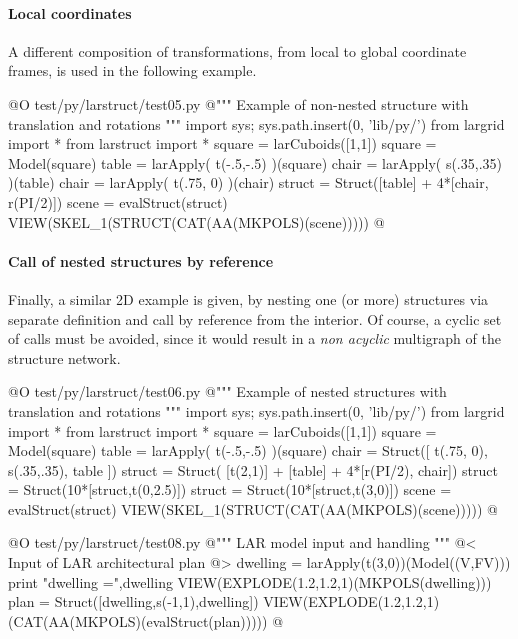 \documentclass[11pt,oneside]{article}    %
\begin{document}
\paragraph{Local coordinates}
A different composition of transformations, from local to global coordinate frames, is used in the following example.

@O test/py/larstruct/test05.py
@{""" Example of non-nested structure with translation and rotations """
import sys; sys.path.insert(0, 'lib/py/')
from largrid import *
from larstruct import *
square = larCuboids([1,1])
square = Model(square)
table = larApply( t(-.5,-.5) )(square)
chair = larApply( s(.35,.35) )(table)
chair = larApply( t(.75, 0) )(chair)
struct = Struct([table] + 4*[chair, r(PI/2)])
scene = evalStruct(struct)
VIEW(SKEL_1(STRUCT(CAT(AA(MKPOLS)(scene)))))
@}

\paragraph{Call of nested structures by reference}
Finally, a similar 2D example is given, by nesting one (or more) structures via separate definition and call by reference from the interior. Of course, a cyclic set of calls must be avoided, since it would result in a \emph{non acyclic} multigraph of the structure network.

@O test/py/larstruct/test06.py
@{""" Example of nested structures with translation and rotations """
import sys; sys.path.insert(0, 'lib/py/')
from largrid import *
from larstruct import *
square = larCuboids([1,1])
square = Model(square)
table = larApply( t(-.5,-.5) )(square)
chair = Struct([ t(.75, 0), s(.35,.35), table ])
struct = Struct( [t(2,1)] + [table] + 4*[r(PI/2), chair])
struct = Struct(10*[struct,t(0,2.5)])
struct = Struct(10*[struct,t(3,0)])
scene = evalStruct(struct)
VIEW(SKEL_1(STRUCT(CAT(AA(MKPOLS)(scene)))))
@}


@O test/py/larstruct/test08.py
@{""" LAR model input and handling """
@< Input of LAR architectural plan @>
dwelling = larApply(t(3,0))(Model((V,FV)))
print "\n dwelling =",dwelling
VIEW(EXPLODE(1.2,1.2,1)(MKPOLS(dwelling)))
plan = Struct([dwelling,s(-1,1),dwelling])
VIEW(EXPLODE(1.2,1.2,1)(CAT(AA(MKPOLS)(evalStruct(plan)))))
@}
\end{document}
